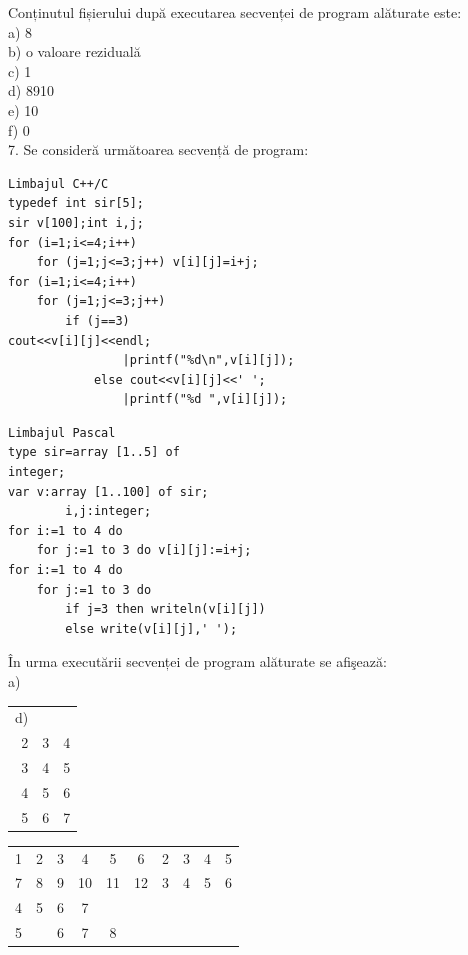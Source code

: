 \documentclass[10pt]{article}
\begin{document}
Conținutul fișierului după executarea secvenței de program alăturate este:\\
a) 8\\
b) o valoare reziduală\\
c) 1\\
d) 8910\\
e) 10\\
f) 0\\
7. Se consideră următoarea secvență de program:

\begin{verbatim}
Limbajul C++/C
typedef int sir[5];
sir v[100];int i,j;
for (i=1;i<=4;i++)
    for (j=1;j<=3;j++) v[i][j]=i+j;
for (i=1;i<=4;i++)
    for (j=1;j<=3;j++)
        if (j==3)
cout<<v[i][j]<<endl;
                |printf("%d\n",v[i][j]);
            else cout<<v[i][j]<<' ';
                |printf("%d ",v[i][j]);
\end{verbatim}

\begin{verbatim}
Limbajul Pascal
type sir=array [1..5] of
integer;
var v:array [1..100] of sir;
        i,j:integer;
for i:=1 to 4 do
    for j:=1 to 3 do v[i][j]:=i+j;
for i:=1 to 4 do
    for j:=1 to 3 do
        if j=3 then writeln(v[i][j])
        else write(v[i][j],' ');
\end{verbatim}

În urma executării secvenței de program alăturate se afişează:\\
a)

\begin{center}
\begin{tabular}{rll}
d) &  &  \\
2 & 3 & 4 \\
3 & 4 & 5 \\
4 & 5 & 6 \\
5 & 6 & 7 \\
\end{tabular}
\end{center}

\begin{center}
\begin{tabular}{cccccccccc}
1 & 2 & 3 & 4 & 5 & 6 & 2 & 3 & 4 & 5 \\
7 & 8 & 9 & 10 & 11 & 12 & 3 & 4 & 5 & 6 \\
4 & 5 & 6 & 7 &  &  &  &  &  &  \\
5 &  & 6 & 7 & 8 &  &  &  &  &  \\
\end{tabular}
\end{center}
\end{document}
